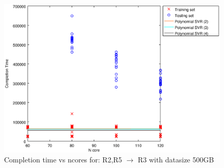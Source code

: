 
\begin {figure}[hbtp]
\centering
\includegraphics[width=\textwidth]{output/R2_R5_VS_R3_500_ALL_FEATURES/plot_R2_R5_VS_R3_500_bestmodels.eps}
\caption{Completion time vs ncores for: R2,R5 $\rightarrow$ R3 with datasize 500GB}
\label{fig:coreonly_linear_R2,R5_R3_500}
\end {figure}
